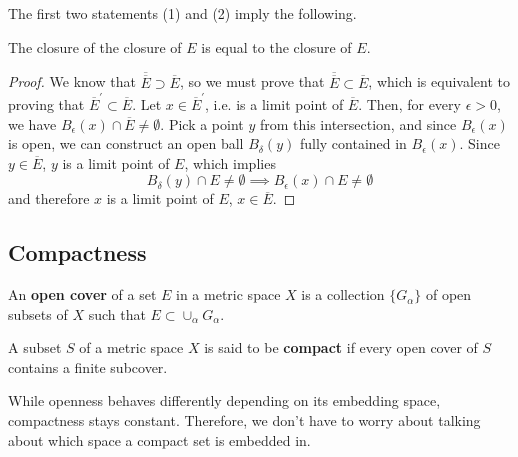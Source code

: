   The first two statements (1) and (2) imply the following. 

  \begin{corollary}
    The closure of the closure of $E$ is equal to the closure of $E$. 
  \end{corollary}
  \begin{proof}
    We know that $\overline{\overline{E}} \supset \overline{E}$, so we must prove that $\overline{\overline{E}} \subset \overline{E}$, which is equivalent to proving that $\overline{E}^\prime \subset \overline{E}$. Let $x \in \overline{E}^\prime$, i.e. is a limit point of $\overline{E}$. Then, for every $\epsilon > 0$, we have $B_\epsilon (x) \cap \overline{E} \neq \emptyset$. Pick a point $y$ from this intersection, and since $B_\epsilon (x)$ is open, we can construct an open ball $B_\delta (y)$ fully contained in $B_\epsilon (x)$. Since $y \in \overline{E}$, $y$ is a limit point of $E$, which implies 
    \begin{equation}
      B_\delta (y) \cap E \neq \emptyset \implies B_\epsilon (x) \cap E \neq \emptyset
    \end{equation}
    and therefore $x$ is a limit point of $E$, $x \in \overline{E}$. 
  \end{proof}

\subsection{Compactness}

  \begin{definition}
    An \textbf{open cover} of a set $E$ in a metric space $X$ is a collection $\{G_\alpha\}$ of open subsets of $X$ such that $E \subset \cup_\alpha G_\alpha$. 
  \end{definition}

  \begin{definition}
    A subset $S$ of a metric space $X$ is said to be \textbf{compact} if every open cover of $S$ contains a finite subcover. 
  \end{definition}

  While openness behaves differently depending on its embedding space, compactness stays constant. Therefore, we don't have to worry about talking about which space a compact set is embedded in. 

